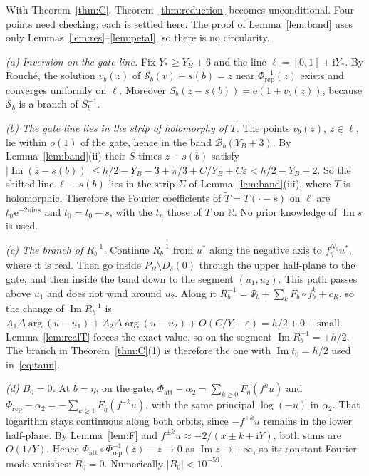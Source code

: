 \documentclass[11pt,a4paper]{article}
\theoremstyle{definition}
\newcommand{\Rr}{R}
\newcommand{\eee}{\mathrm{e}}
\newcommand{\ii}{\mathrm{i}}
\begin{document}
With Theorem~\ref{thm:C}, Theorem~\ref{thm:reduction} becomes unconditional.
Four points need checking; each is settled here.  The proof of
Lemma~\ref{lem:band} uses only Lemmas~\ref{lem:res}--\ref{lem:petal}, so there is
no circularity.

\emph{(a) Inversion on the gate line.}  Fix $Y_*\ge Y_B+6$ and the line
$\ell=[0,1]+\ii Y_*$.  By Rouch\'e, the solution $v_b(z)$ of
$\mathcal S_b(v)+s(b)=z$ near $\Phi_{\mathrm{rep}}^{-1}(z)$ exists and converges
uniformly on $\ell$.  Moreover $S_b(z-s(b))=\eee(1+v_b(z))$, because $\mathcal S_b$
is a branch of $S_b^{-1}$.

\emph{(b) The gate line lies in the strip of holomorphy of $T$.}  The points
$v_b(z)$, $z\in\ell$, lie within $o(1)$ of the gate, hence in the band $\mathcal B_b(Y_B+3)$.
By Lemma~\ref{lem:band}(ii) their $S$-times $z-s(b)$ satisfy
$|\operatorname{Im}(z-s(b))|\le h/2-Y_B-3+\pi/3+C/Y_B+C\varepsilon<h/2-Y_B-2$.  So the
shifted line $\ell-s(b)$ lies in the strip $\Sigma$ of Lemma~\ref{lem:band}(iii),
where $T$ is holomorphic.  Therefore the Fourier coefficients of
$\tilde T=T(\cdot-s)$ on $\ell$ are $t_n\eee^{-2\pi\ii ns}$ and
$\tilde t_0=t_0-s$, with the $t_n$ those of $T$ on $\mathbb R$.  No prior
knowledge of $\operatorname{Im}s$ is used.

\emph{(c) The branch of $\Rr_b^{-1}$.}  Continue $\Rr_b^{-1}$ from $u^*$ along
the negative axis to $f_\eta^{N_0}u^*$, where it is real.  Then go inside
$P_R\setminus D_\delta(0)$ through the upper half-plane to the gate, and then
inside the band down to the segment $(u_1,u_2)$.  This path passes above $u_1$
and does not wind around $u_2$.  Along it $\Rr_b^{-1}=\Psi_b+\sum_kF_b\circ f_b^k+c_R$, so the change of
$\operatorname{Im}\Rr_b^{-1}$ is
$A_1\Delta\arg(u-u_1)+A_2\Delta\arg(u-u_2)+O(C/Y+\varepsilon)=h/2+0+\text{small}$.
Lemma~\ref{lem:realT} forces the exact value, so on the segment
$\operatorname{Im}\Rr_b^{-1}=+h/2$.  The branch in
Theorem~\ref{thm:C}(1) is therefore the one with $\operatorname{Im}t_0=h/2$ used
in~\eqref{eq:taun}.

\emph{(d) $B_0=0$.}  At $b=\eta$, on the gate,
$\Phi_{\mathrm{att}}-\alpha_2=\sum_{k\ge0}F_\eta(f^ku)$ and
$\Phi_{\mathrm{rep}}-\alpha_2=-\sum_{k\ge1}F_\eta(f^{-k}u)$, with the same
principal $\log(-u)$ in $\alpha_2$.  That logarithm stays continuous along both
orbits, since $-f^{\pm k}u$ remains in the lower half-plane.  By
Lemma~\ref{lem:F} and $f^{\pm k}u\approx-2/(x\pm k+\ii Y)$, both sums are
$O(1/Y)$.  Hence $\Phi_{\mathrm{att}}\circ\Phi_{\mathrm{rep}}^{-1}(z)-z\to0$ as
$\operatorname{Im}z\to+\infty$, so its constant Fourier mode vanishes:
$B_0=0$.  Numerically $|B_0|<10^{-59}$.
\end{document}
